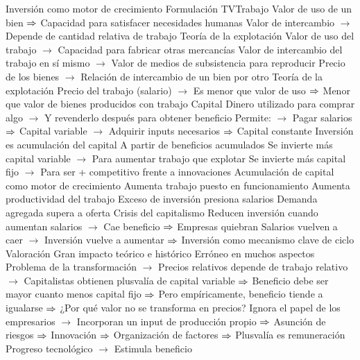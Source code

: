 \documentclass{nuevotema}
\begin{document}
\begin{esquemal}
				\4[] Inversión como motor de crecimiento
			\3 Formulación
				\4 TVTrabajo
				\4[] Valor de uso de un bien
				\4[] $\Rightarrow$ Capacidad para satisfacer necesidades humanas
				\4[] Valor de intercambio
				\4[] $\to$ Depende de cantidad relativa de trabajo
				\4 Teoría de la explotación
				\4[] Valor de uso del trabajo
				\4[] $\to$ Capacidad para fabricar otras mercancías
				\4[] Valor de intercambio del trabajo en sí mismo
				\4[] $\to$ Valor de medios de subsistencia para reproducir
				\4[] Precio de los bienes
				\4[] $\to$ Relación de intercambio de un bien por otro
				\4 Teoría de la explotación
				\4[] Precio del trabajo (salario)
				\4[] $\to$ Es menor que valor de uso
				\4[] $\Rightarrow$ Menor que valor de bienes producidos con trabajo
				\4 Capital
				\4[] Dinero utilizado para comprar algo
				\4[] $\to$ Y revenderlo después para obtener beneficio
				\4[] Permite:
				\4[] $\to$ Pagar salarios
				\4[] $\Rightarrow$ Capital variable
				\4[] $\to$ Adquirir inputs necesarios
				\4[] $\Rightarrow$ Capital constante
				\4 Inversión es acumulación del capital
				\4[] A partir de beneficios acumulados
				\4[] Se invierte más capital variable
				\4[] $\to$ Para aumentar trabajo que explotar
				\4[] Se invierte más capital fijo
				\4[] $\to$ Para ser + competitivo frente a innovaciones
				\4 Acumulación de capital como motor de crecimiento
				\4[] Aumenta trabajo puesto en funcionamiento
				\4[] Aumenta productividad del trabajo
				\4 Exceso de inversión presiona salarios
				\4[] Demanda agregada supera a oferta
				\4 Crisis del capitalismo
				\4[] Reducen inversión cuando aumentan salarios
				\4[] $\to$ Cae beneficio
				\4[] $\Rightarrow$ Empresas quiebran
				\4[] Salarios vuelven a caer
				\4[] $\to$ Inversión vuelve a aumentar
				\4[] $\Rightarrow$ Inversión como mecanismo clave de ciclo
			\3 Valoración
				\4 Gran impacto teórico e histórico
				\4 Erróneo en muchos aspectos
				\4[] Problema de la transformación
				\4[] $\to$ Precios relativos depende de trabajo relativo
				\4[] $\to$ Capitalistas obtienen plusvalía de capital variable
				\4[] $\Rightarrow$ Beneficio debe ser mayor cuanto menos capital fijo
				\4[] $\Rightarrow$ Pero empíricamente, beneficio tiende a igualarse
				\4[] $\Rightarrow$ ¿Por qué valor no se transforma en precios?
				\4[] Ignora el papel de los empresarios
				\4[] $\to$ Incorporan un input de producción propio
				\4[] $\Rightarrow$ Asunción de riesgos
				\4[] $\Rightarrow$ Innovación
				\4[] $\Rightarrow$ Organización de factores
				\4[] $\Rightarrow$ Plusvalía es remuneración
				\4[] Progreso tecnológico
				\4[] $\to$ Estimula beneficio

\end{esquemal}
\end{document}
